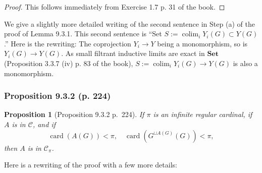 \documentclass[12pt]{article}%
\newtheorem{prop}[thm]{Proposition}
\theoremstyle{remark}
\theoremstyle{definition}
\newcommand{\C}{\mathcal C}
\newcommand{\Set}{\mathbf{Set}}
\DeclareMathOperator*{\colim}{colim}
\DeclareMathOperator{\card}{card}%
\begin{document}
\begin{proof}
This follows immediately from Exercise 1.7 p. 31 of the book.
\end{proof}

We give a slightly more detailed writing of the second sentence in Step (a) of the proof of Lemma 9.3.1. This second sentence is ``Set $S:=\colim_iY_i(G)\subset Y(G)$.'' Here is the rewriting: The coprojection $Y_i\to Y$ being a monomorphism, so is $Y_i(G)\to Y(G)$. As small filtrant inductive limits are exact in $\Set$ (Proposition 3.3.7 (iv) p. 83 of the book), $S:=\colim_iY_i(G)\to Y(G)$ is also a monomorphism.

%

\subsubsection{Proposition 9.3.2 (p. 224)}

\begin{prop}[Proposition 9.3.2 p.~224]\label{932}
If $\pi$ is an infinite regular cardinal, if $A$ is in $\C$, and if 
$$
\card(A(G))<\pi,\quad\card(G^{\sqcup A(G)}(G))<\pi,
$$ 
then $A$ is in $\C_\pi$.
\end{prop}

Here is a rewriting of the proof with a few more details:
\end{document}
